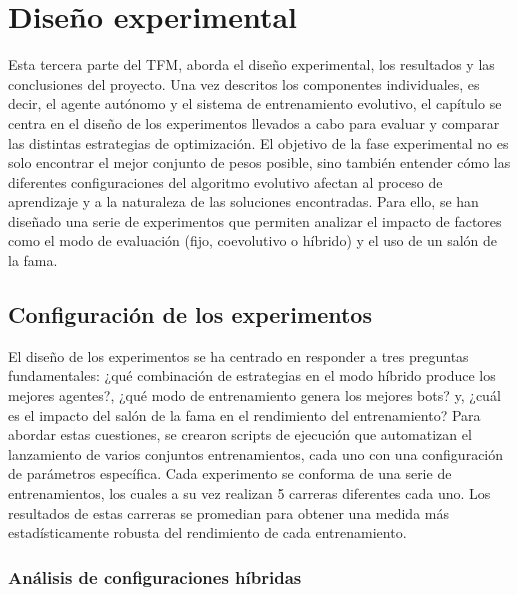 \chapter{Diseño experimental} \label{chap:experimentacion}

Esta tercera parte del TFM, aborda el diseño experimental, los resultados y las conclusiones del proyecto. Una vez descritos los componentes individuales, es decir, el agente autónomo y el sistema de entrenamiento evolutivo, el capítulo se centra en el diseño de los experimentos llevados a cabo para evaluar y comparar las distintas estrategias de optimización. El objetivo de la fase experimental no es solo encontrar el mejor conjunto de pesos posible, sino también entender cómo las diferentes configuraciones del algoritmo evolutivo afectan al proceso de aprendizaje y a la naturaleza de las soluciones encontradas. Para ello, se han diseñado una serie de experimentos que permiten analizar el impacto de factores como el modo de evaluación (fijo, coevolutivo o híbrido) y el uso de un salón de la fama.

\section{Configuración de los experimentos} \label{sec:configuracion_experimentos}

El diseño de los experimentos se ha centrado en responder a tres preguntas fundamentales: ¿qué combinación de estrategias en el modo híbrido produce los mejores agentes?, ¿qué modo de entrenamiento genera los mejores bots? y, ¿cuál es el impacto del salón de la fama en el rendimiento del entrenamiento? Para abordar estas cuestiones, se crearon scripts de ejecución que automatizan el lanzamiento de varios conjuntos entrenamientos, cada uno con una configuración de parámetros específica. Cada experimento se conforma de una serie de entrenamientos, los cuales a su vez realizan 5 carreras diferentes cada uno. Los resultados de estas carreras se promedian para obtener una medida más estadísticamente robusta del rendimiento de cada entrenamiento.


\subsection{Análisis de configuraciones híbridas} \label{sec:experimentos_hibridos}

